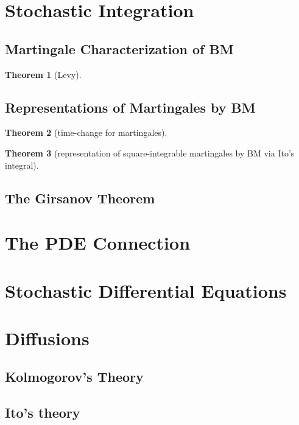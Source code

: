 \documentclass{article}
\newtheorem{Thm}{Theorem}[section]
\theoremstyle{definition}
\newcommand{\<}{\left\langle}
\renewcommand{\>}{\right\rangle}
\begin{document}
\section{Stochastic Integration}
\subsection{}


\subsection{Martingale Characterization of BM}
\begin{Thm}[Levy]
    
\end{Thm}

\subsection{Representations of Martingales by BM}


\begin{Thm}[time-change for martingales]
    
\end{Thm}


\begin{Thm}[representation of square-integrable martingales by BM via Ito's integral]
    
\end{Thm}

\subsection{The Girsanov Theorem}


\section{The PDE Connection}




\section{Stochastic Differential Equations}




\section{Diffusions}

\subsection{Kolmogorov's Theory}


\subsection{Ito's theory}
\end{document}
